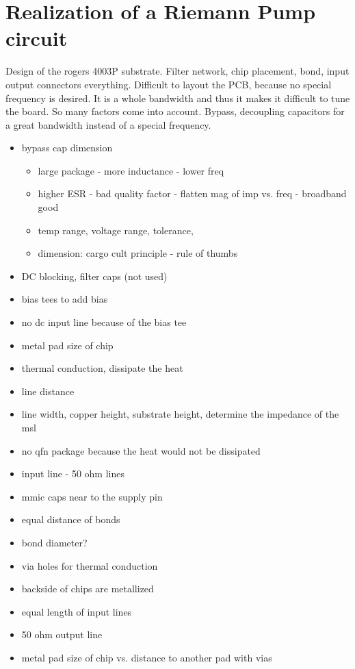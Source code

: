 \chapter{Realization of a Riemann Pump circuit}
Design of the rogers 4003P substrate. Filter network, chip placement, bond, input output connectors everything. Difficult to layout the PCB, because no special frequency is desired. It is a whole bandwidth and thus it makes it difficult to tune the board. So many factors come into account. Bypass, decoupling capacitors for a great bandwidth instead of a special frequency. 
\begin{itemize}
	\item bypass cap dimension
	\begin{itemize}
		\item large package - more inductance - lower freq
		\item higher ESR - bad quality factor - flatten mag of imp vs. freq - broadband good
		\item temp range, voltage range, tolerance, 
		\item dimension: cargo cult principle - rule of thumbs
	\end{itemize}
	\item DC blocking, filter caps (not used) 
	\item bias tees to add bias 
	\item no dc input line because of the bias tee
	\item metal pad size of chip
	\item thermal conduction, dissipate the heat
	\item line distance
	\item line width, copper height, substrate height, determine the impedance of the msl
	\item no qfn package because the heat would not be dissipated
	\item input line - 50 ohm lines
	\item mmic caps near to the supply pin
	\item equal distance of bonds
	\item bond diameter?
	\item via holes for thermal conduction
	\item backside of chips are metallized
	\item equal length of input lines
	\item 50 ohm output line
	\item metal pad size of chip vs. distance to another pad with vias

\end{itemize}
